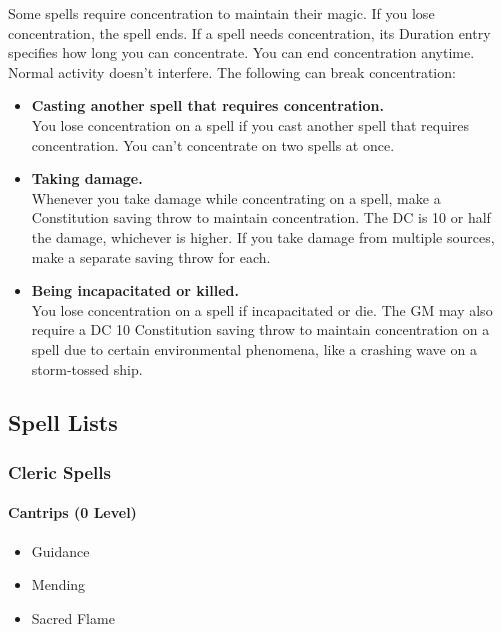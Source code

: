 Some spells require concentration to maintain their magic. If you lose
concentration, the spell ends. If a spell needs concentration, its
Duration entry specifies how long you can concentrate. You can end
concentration anytime. Normal activity doesn't interfere. The following
can break concentration:

\begin{itemize}
\item
  \textbf{Casting another spell that requires concentration.}\\
  You lose concentration on a spell if you cast another spell that
  requires concentration. You can't concentrate on two spells at once.
\item
  \textbf{Taking damage.}\\
  Whenever you take damage while concentrating on a spell, make a
  Constitution saving throw to maintain concentration. The DC is 10 or
  half the damage, whichever is higher. If you take damage from multiple
  sources, make a separate saving throw for each.
\item
  \textbf{Being incapacitated or killed.}\\
  You lose concentration on a spell if incapacitated or die. The GM may
  also require a DC 10 Constitution saving throw to maintain
  concentration on a spell due to certain environmental phenomena, like
  a crashing wave on a storm-tossed ship.
\end{itemize}

\subsection{Spell Lists}\label{PlayersGuide_spell-lists}

\subsubsection{Cleric Spells}\label{Cleric_Spells_cleric-spells}

\paragraph{Cantrips (0 Level)}\label{Cleric_Spells_cantrips-0-level}

\begin{itemize}
\item
  Guidance
\item
  Mending
\item
  Sacred Flame
\end{itemize}

